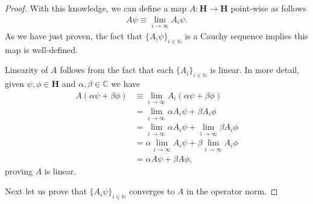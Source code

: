 \begin{proof}
    With this knowledge, we can define a map $A : \mathbf{H} \rightarrow \mathbf{H}$ point-wise as follows
    \begin{align}
        A\psi \equiv \lim\limits_{i \rightarrow \infty} A_i\psi.
    \end{align}
    As we have just proven, the fact that $\{A_i\psi\}_{i \in \mathbb{N}}$ is a Cauchy sequence implies this map is well-defined. 

    Linearity of $A$ follows from the fact that each $\{A_i\}_{i \in \mathbb{N}}$ is linear. In more detail, given $\psi,\phi \in \mathbf{H}$ and $\alpha,\beta \in \mathbb{C}$ we have
    \begin{align}
        A(\alpha\psi + \beta\phi) &\equiv \lim\limits_{i \rightarrow \infty} A_i (\alpha\psi + \beta\phi) \\
                                  &= \lim\limits_{i \rightarrow \infty} \alpha A_i\psi + \beta A_i\phi \\
                                  &= \lim\limits_{i \rightarrow \infty} \alpha A_i\psi + \lim\limits_{i \rightarrow \infty} \beta A_i\phi \\
                                  &= \alpha \lim\limits_{i \rightarrow \infty} A_i\psi + \beta \lim\limits_{i \rightarrow \infty} A_i\phi \\
                                  &= \alpha A\psi + \beta A\phi,
    \end{align}
    proving $A$ is linear.

    Next let us prove that $\{A_i\psi\}_{i \in \mathbb{N}}$ converges to $A$ in the operator norm.


\end{proof}
